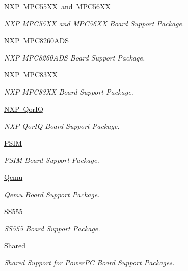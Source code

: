 \begin{DoxyCompactItemize}
\mbox{\hyperlink{group__RTEMSBSPsPowerPCMPC55XX}{N\+X\+P M\+P\+C55\+X\+X and M\+P\+C56\+XX}}
\begin{DoxyCompactList}\small\item\em N\+XP M\+P\+C55\+XX and M\+P\+C56\+XX Board Support Package. \end{DoxyCompactList}\item 
\mbox{\hyperlink{group__RTEMSBSPsPowerPCMPC8260ADS}{N\+X\+P M\+P\+C8260\+A\+DS}}
\begin{DoxyCompactList}\small\item\em N\+XP M\+P\+C8260\+A\+DS Board Support Package. \end{DoxyCompactList}\item 
\mbox{\hyperlink{group__RTEMSBSPsPowerPCGen83XX}{N\+X\+P M\+P\+C83\+XX}}
\begin{DoxyCompactList}\small\item\em N\+XP M\+P\+C83\+XX Board Support Package. \end{DoxyCompactList}\item 
\mbox{\hyperlink{group__RTEMSBSPsPowerPCQorIQ}{N\+X\+P Qor\+IQ}}
\begin{DoxyCompactList}\small\item\em N\+XP Qor\+IQ Board Support Package. \end{DoxyCompactList}\item 
\mbox{\hyperlink{group__RTEMSBSPsPowerPCPSIM}{P\+S\+IM}}
\begin{DoxyCompactList}\small\item\em P\+S\+IM Board Support Package. \end{DoxyCompactList}\item 
\mbox{\hyperlink{group__RTEMSBSPsPowerPCQemu}{Qemu}}
\begin{DoxyCompactList}\small\item\em Qemu Board Support Package. \end{DoxyCompactList}\item 
\mbox{\hyperlink{group__RTEMSBSPsPowerPCSS555}{S\+S555}}
\begin{DoxyCompactList}\small\item\em S\+S555 Board Support Package. \end{DoxyCompactList}\item 
\mbox{\hyperlink{group__RTEMSBSPsPowerPCShared}{Shared}}
\begin{DoxyCompactList}\small\item\em Shared Support for Power\+PC Board Support Packages. \end{DoxyCompactList}\item 

\end{DoxyCompactItemize}
